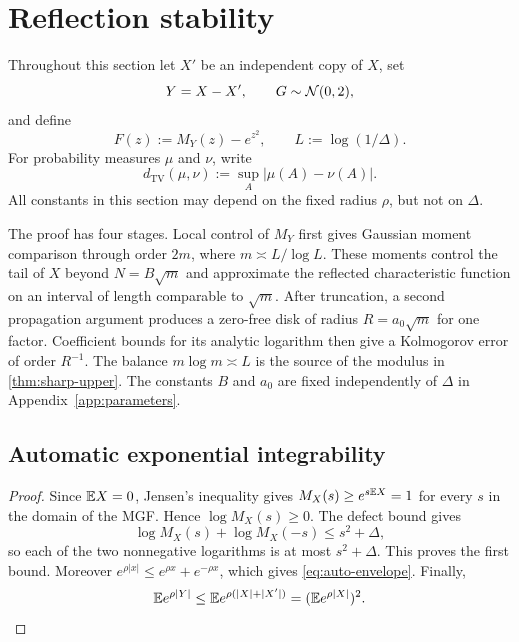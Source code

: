 \section{Reflection stability}\label{sec:upper}

Throughout this section let $X'$ be an independent copy of $X$, set
\[
Y=X-X',\qquad G\sim\mathcal N(0,2),
\]
and define
\[
F(z):=M_Y(z)-e^{z^2},\qquad
L:=\log(1/\Delta).
\]
For probability measures $\mu$ and $\nu$, write
\[
d_{\mathrm{TV}}(\mu,\nu):=\sup_A|\mu(A)-\nu(A)|.
\]
All constants in this section may depend on the fixed radius $\rho$, but not on $\Delta$.

The proof has four stages. Local control of $M_Y$ first gives Gaussian moment comparison through order $2m$, where $m\asymp L/\log L$. These moments control the tail of $X$ beyond $N=B\sqrt m$ and approximate the reflected characteristic function on an interval of length comparable to $\sqrt m$. After truncation, a second propagation argument produces a zero-free disk of radius $R=a_0\sqrt m$ for one factor. Coefficient bounds for its analytic logarithm then give a Kolmogorov error of order $R^{-1}$. The balance $m\log m\asymp L$ is the source of the modulus in \cref{thm:sharp-upper}. The constants $B$ and $a_0$ are fixed independently of $\Delta$ in Appendix~\ref{app:parameters}.

\subsection{Automatic exponential integrability}


\begin{proof}
Since $\mathbb E X=0$, Jensen's inequality gives $M_X(s)\ge e^{s\mathbb E X}=1$ for every $s$ in the domain of the MGF. Hence $\log M_X(s)\ge0$. The defect bound gives
\[
\log M_X(s)+\log M_X(-s)\le s^2+\Delta,
\]
so each of the two nonnegative logarithms is at most $s^2+\Delta$. This proves the first bound. Moreover $e^{\rho|x|}\le e^{\rho x}+e^{-\rho x}$, which gives \eqref{eq:auto-envelope}. Finally,
\[
\mathbb E e^{\rho|Y|}
\le \mathbb E e^{\rho(|X|+|X'|)}
=(\mathbb E e^{\rho|X|})^2.
\]
\end{proof}

